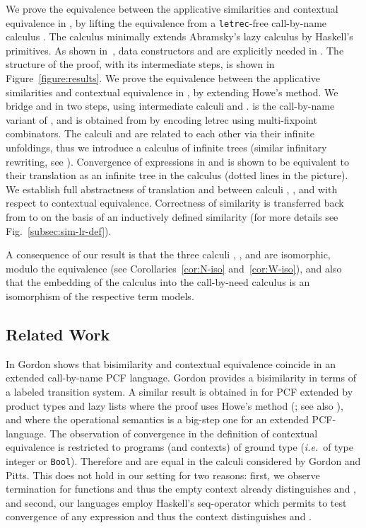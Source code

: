 \documentclass{LMCS}
\theoremstyle{plain}
\theoremstyle{definition}
\newcommand{\ie}{{\em i.e.}}
\newcommand{\FIGURE}{Fig.}
\newcommand{\tletrec}{{\tt letrec}}
\begin{document}
We prove the equivalence between the applicative similarities and contextual 
equivalence in , by lifting the equivalence from a \tletrec-free call-by-name calculus . 
The calculus  minimally extends Abramsky's lazy calculus by Haskell's
primitives. 
As shown in~\cite{schmidt-schauss-machkasova-sabel:rta:2013}, data constructors
and  are explicitly needed in .
The structure of the proof, with its intermediate steps, is shown in Figure~\ref{figure:results}.
We prove the equivalence between the applicative similarities and contextual
equivalence in , by extending Howe's method. 
We bridge  and  in two steps, using intermediate calculi 
 and .  is the call-by-name variant of , and
 is obtained from  by encoding letrec using multi-fixpoint
combinators. 
The calculi  and  are related to each other via their infinite 
unfoldings, thus we introduce a calculus  of infinite trees 
(similar infinitary rewriting, see \cite{kennaway-klop:97,schmidt-schauss-copy-rta:07}).
Convergence of expressions in  and  is shown to be equivalent to
their translation as an infinite tree in the calculus  (dotted lines in
the picture).
We establish full abstractness of translation  and  between calculi 
, , and  with respect to contextual equivalence. 
Correctness of similarity is transferred back from  to  on the
basis of an inductively defined similarity (for more details see 
\FIGURE~\ref{subsec:sim-lr-def}).
 
A consequence of our result is that the three calculi , , and
 are isomorphic, modulo the equivalence 
(see Corollaries~\ref{cor:N-iso} and~\ref{cor:W-iso}), and also that the 
embedding of the calculus  into the call-by-need calculus  is
an isomorphism of the respective term models. 

\subsection*{Related Work}
In \cite {Gordon:99} Gordon shows that bisimilarity and contextual equivalence
coincide in an extended call-by-name PCF language.
Gordon provides a bisimilarity in terms of a labeled transition system.  
A similar result is obtained in \cite{pitts:97} for PCF extended by product 
types and lazy lists where the proof uses Howe's method 
(\cite{howe:89,howe:96}; see also \cite{mannmss:10,Pitts:2011}), and where the
operational semantics is a big-step one for an extended PCF-language.
The observation of convergence in the definition of contextual equivalence is 
restricted to programs (and contexts) of ground type (\ie\ of type integer or
{\tt Bool}). 
Therefore  and  are equal in the calculi considered
by Gordon and Pitts. 
This does not hold in our setting for two reasons: 
first, we observe termination for functions and thus the empty context already
distinguishes  and , and second, our languages employ 
Haskell's seq-operator which permits to test convergence of any expression and
thus the context  distinguishes  and 
.
\end{document}
